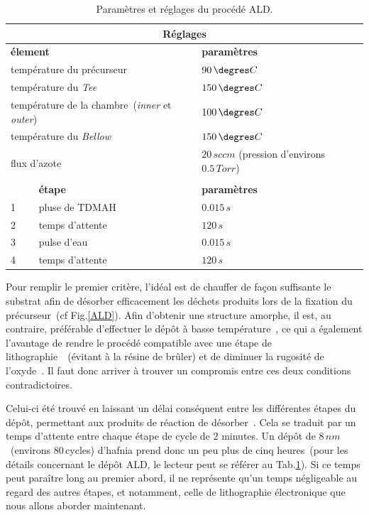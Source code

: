 \begin{table}
\begin{center}
\begin{tabular}{|p{0.5cm}|p{6cm}|p{6cm}|}
\hline
\multicolumn{3}{|c|}{\textbf{Réglages}} \tabularnewline
\hline
\multicolumn{2}{|l|}{\textbf{élement}} & \textbf{paramètres} \tabularnewline
\hline
\multicolumn{2}{|l|}{température du précurseur} & $90\, \degres C$ \tabularnewline
\hline
\multicolumn{2}{|l|}{température du \textit{Tee}} & $150\, \degres C$ \tabularnewline
\hline
\multicolumn{2}{|l|}{température de la chambre~(\textit{inner} et \textit{outer})} & $100\, \degres C$ \tabularnewline
\hline
\multicolumn{2}{|l|}{température du \textit{Bellow}} & $150\, \degres C$ \tabularnewline
\hline
\multicolumn{2}{|l|}{\multirow{2}{*}{flux d'azote}} & $20\, sccm$ \newline (pression d'environs $0.5\,Torr$) \tabularnewline
\hline
\hline
\multicolumn{3}{|c|}{\textbf{Procédé}} \tabularnewline
\hline
\,& \textbf{étape} & \textbf{paramètres} \tabularnewline
\hline
1 & pluse de TDMAH & $0.015\,s$ \tabularnewline
\hline
2 & temps d'attente & $120\,s$ \tabularnewline
\hline
3 & pulse d'eau & $0.015\,s$ \tabularnewline
\hline
4 & temps d'attente & $120\,s$ \tabularnewline
\hline
\end{tabular}
\caption{Paramètres et réglages du procédé ALD.}
\label{recette_ALD}
\end{center}
\end{table}



Pour remplir le premier critère, l'idéal est de chauffer de façon suffisante le substrat afin de désorber efficacement les déchets produits lors de la fixation du précurseur~(cf Fig.\ref{ALD}). Afin d'obtenir une structure amorphe, il est, au contraire, préférable d'effectuer le dép\^ot à basse température~\cite{Triyoso2004}, ce qui a également l'avantage de rendre le procédé compatible avec une étape de lithographie~\cite{Biercuk2003}~(évitant à la résine de brûler) et de diminuer la rugosité de l'oxyde~\cite{Triyoso2004}. Il faut donc arriver à trouver un compromis entre ces deux conditions contradictoires.

Celui-ci été trouvé en laissant un délai conséquent entre les différentes étapes du dépôt, permettant aux produits de réaction de désorber~\cite{Biercuk2003}. Cela se traduit par un temps d'attente entre chaque étape de cycle de 2 minutes. Un dépôt de $8\,nm$~(environs 80\,cycles) d'hafnia prend donc un peu plus de cinq heures~(pour les détails concernant le dépôt ALD, le lecteur peut se référer au Tab.\ref{recette_ALD}). Si ce temps peut paraître long au premier abord, il ne représente qu'un temps négligeable au regard des autres étapes, et notamment, celle de lithographie électronique que nous allons aborder maintenant.

